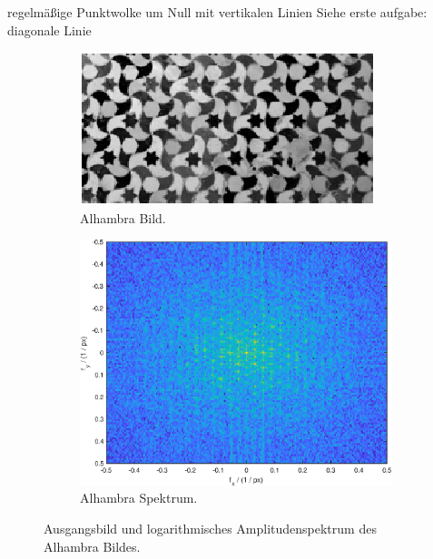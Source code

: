 regelmäßige Punktwolke um Null mit vertikalen Linien
Siehe erste aufgabe: diagonale Linie
\begin{figure}[!h]
\centering
\begin{subfigure}[b]{0.45\textwidth}
    \centering
    \includegraphics[width=\textwidth]{ue5/alhambra_im.eps}
    \caption{Alhambra Bild.}
    \label{fig:alhambra_im}
\end{subfigure}
\begin{subfigure}[b]{0.45\textwidth}
    \centering
    \includegraphics[width=.85\textwidth]{ue5/alhambra_spec.eps}
    \caption{Alhambra Spektrum.}
    \label{fig:alhambra_spec}
\end{subfigure}
\label{fig:alhambra}
\caption{Ausgangsbild und logarithmisches Amplitudenspektrum des Alhambra Bildes.}
\end{figure}

